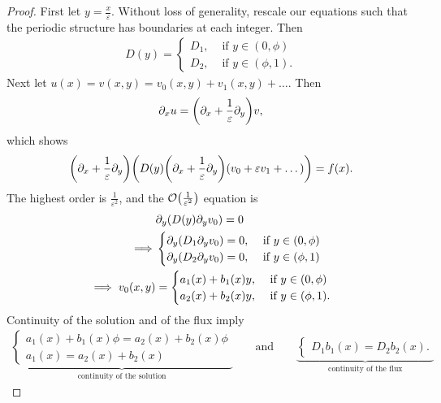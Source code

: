 \documentclass{article} %
\theoremstyle{plain}
\newcommand{\dy}{\partial_y}
\newcommand{\dx}{\partial_x}
\newcommand{\E}{\varepsilon}
\numberwithin{equation}{section} %
\numberwithin{figure}{section} %
\numberwithin{table}{section} %
\begin{document}
\begin{proof}
    First let $y = \frac{x}{\E}$.  Without loss of generality, rescale our equations such that the periodic structure has boundaries at each integer.  Then
    \begin{align*}
        D(y) = \begin{cases}
            D_1, & \text{ if } y \in (0, \phi) \\
            D_2, & \text{ if } y \in (\phi, 1).
        \end{cases}
    \end{align*}
    Next let $u(x) = v(x,y) = v_0(x,y) + v_1(x,y) + \dots$.  Then $$\dx u = \qty(\dx + \frac{1}{\E}\dy) v,$$ which shows
    \begin{align*}
        \qty(\dx + \frac{1}{\E}\dy)\qty(D(y)\qty(\dx + \frac{1}{\E}\dy)\qty(v_0 + \E v_1 + \dots)) = f(x).
    \end{align*}
    The highest order is $\frac{1}{\E^2}$, and the $\order{\frac{1}{\E^2}}$ equation is
    \begin{align*}
        &\dy\qty(D(y)\dy v_0) = 0 \\
        \implies &\begin{cases}
            \dy\qty(D_1\dy v_0) = 0, & \text{ if } y \in (0, \phi) \\
            \dy\qty(D_2\dy v_0) = 0, & \text{ if } y \in (\phi, 1)
        \end{cases} \\
        \implies v_0(x,y) &= \begin{cases}
            a_1(x) + b_1(x)y, & \text{ if } y \in (0, \phi) \\
            a_2(x) + b_2(x)y, & \text{ if } y \in (\phi, 1).
        \end{cases}
    \end{align*}
    Continuity of the solution and of the flux imply
    \begin{align*}
        \underbrace{\begin{cases}
                    a_1(x) + b_1(x)\phi = a_2(x) + b_2(x)\phi \\
                    a_1(x) = a_2(x) + b_2(x)
                \end{cases}}_{\text{continuity of the solution}} \qquad \text{and} \qquad \underbrace{\begin{cases}
                    D_1 b_1(x) = D_2 b_2(x).
                \end{cases}}_{\text{continuity of the flux}}
    \end{align*}

\end{proof}
\end{document}
